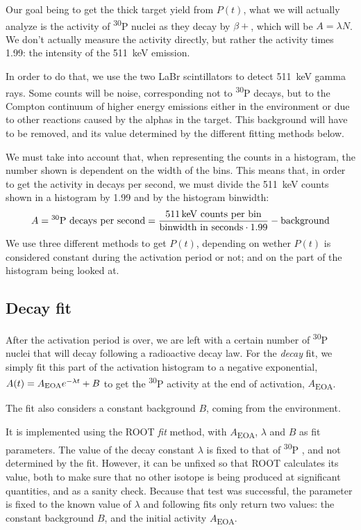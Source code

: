\documentclass[a4paper,12pt]{report}
\newcommand{\Piso}{\textsuperscript{30}P }
\begin{document}
Our goal being to get the thick target yield from $P(t)$, what we will actually analyze is the activity of \Piso nuclei as they decay by $\beta +$, which will be $A = \lambda N$.
We don't actually measure the activity directly, but rather the activity times \num{1.99}: the intensity of the \qty{511}{\keV} emission.	%

In order to do that, we use the two LaBr scintillators to detect \qty{511}{\keV} gamma rays.
Some counts will be noise, corresponding not to \Piso decays, but to the Compton continuum of higher energy emissions either in the environment or due to other reactions caused by the alphas in the target.
This background will have to be removed, and its value determined by the different fitting methods below.

We must take into account that, when representing the counts in a histogram, the number shown is dependent on the width of the bins.
This means that, in order to get the activity in decays per second, we must divide the \qty{511}{\keV} counts shown in a histogram by \num{1.99} and by the histogram binwidth:
\begin{equation}
	A = \text{\Piso decays per second} = \frac{\text{\qty{511}{\keV} counts per bin}}{\text{binwidth in seconds}\cdot\num{1.99}} - \text{background}
\end{equation}
We use three different methods to get $P(t)$, depending on wether $P(t)$ is considered constant during the activation period or not; and on the part of the histogram being looked at.

\subsection{Decay fit}
After the activation period is over, we are left with a certain number of \Piso nuclei that will decay following a radioactive decay law.
For the \textit{decay} fit, we simply fit this part of the activation histogram to a negative exponential, $A(t) = A\textsubscript{EOA} e^{-\lambda t} + B$ to get the \Piso activity at the end of activation, $A$\textsubscript{EOA}.

The fit also considers a constant background $B$, coming from the environment.

It is implemented using the ROOT \textit{fit} method, with $A$\textsubscript{EOA}, $\lambda$ and $B$ as fit parameters.
The value of the decay constant $\lambda$ is fixed to that of \Piso, and not determined by the fit.
However, it can be unfixed so that ROOT calculates its value, both to make sure that no other isotope is being produced at significant quantities, and as a sanity check.
Because that test was successful, the parameter is fixed to the known value of $\lambda$ and following fits only return two values: the constant background $B$, and the initial activity $A$\textsubscript{EOA}.
\\
\end{document}
